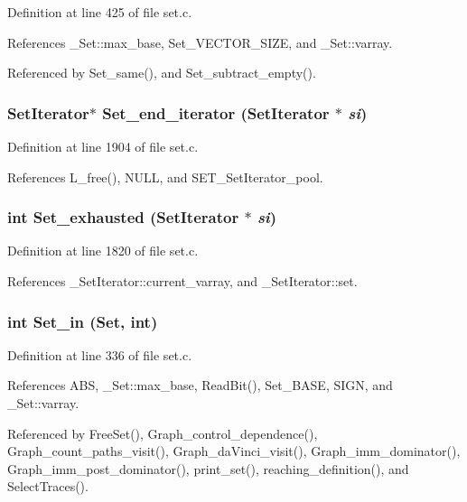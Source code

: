 Definition at line 425 of file set.c.

References \_\-Set::max\_\-base, Set\_\-VECTOR\_\-SIZE, and \_\-Set::varray.

Referenced by Set\_\-same(), and Set\_\-subtract\_\-empty().
\subsubsection{\setlength{\rightskip}{0pt plus 5cm}\bf{Set\-Iterator}$\ast$ Set\_\-end\_\-iterator (\bf{Set\-Iterator} $\ast$ {\em si})}\label{set_8h_bf35c6edfe607eb753491656258013f4}




Definition at line 1904 of file set.c.

References L\_\-free(), NULL, and SET\_\-Set\-Iterator\_\-pool.
\subsubsection{\setlength{\rightskip}{0pt plus 5cm}int Set\_\-exhausted (\bf{Set\-Iterator} $\ast$ {\em si})}\label{set_8h_16ec1ddec124e852fa5ef7a5239924f2}




Definition at line 1820 of file set.c.

References \_\-Set\-Iterator::current\_\-varray, and \_\-Set\-Iterator::set.
\subsubsection{\setlength{\rightskip}{0pt plus 5cm}int Set\_\-in (\bf{Set}, int)}\label{set_8h_438a5d0c74588b311a5a534b1a3432a6}




Definition at line 336 of file set.c.

References ABS, \_\-Set::max\_\-base, Read\-Bit(), Set\_\-BASE, SIGN, and \_\-Set::varray.

Referenced by Free\-Set(), Graph\_\-control\_\-dependence(), Graph\_\-count\_\-paths\_\-visit(), Graph\_\-da\-Vinci\_\-visit(), Graph\_\-imm\_\-dominator(), Graph\_\-imm\_\-post\_\-dominator(), print\_\-set(), reaching\_\-definition(), and Select\-Traces().
